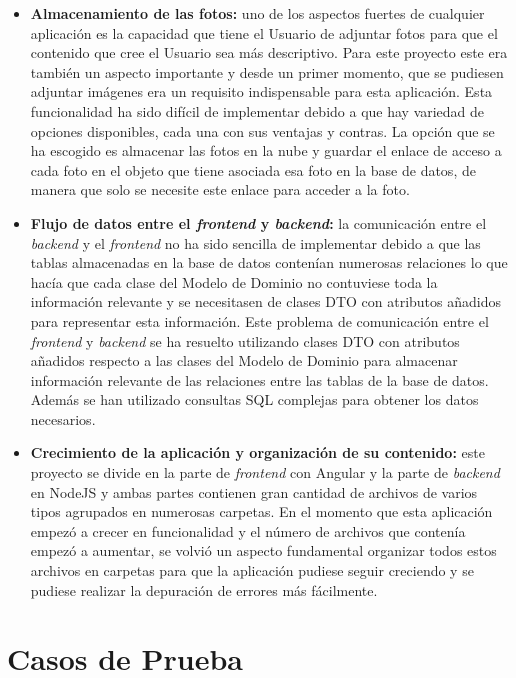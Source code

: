 \begin{itemize}
    \item \textbf{Almacenamiento de las fotos:} uno de los aspectos fuertes de cualquier aplicación es la capacidad que tiene el Usuario de adjuntar fotos para que el contenido que cree el Usuario sea más descriptivo. Para este proyecto este era también un aspecto importante y desde un primer momento, que se pudiesen adjuntar imágenes era un requisito indispensable para esta aplicación. Esta funcionalidad ha sido difícil de implementar debido a que hay variedad de opciones disponibles, cada una con sus ventajas y contras. La opción que se ha escogido es almacenar las fotos en la nube y guardar el enlace de acceso a cada foto en el objeto que tiene asociada esa foto en la base de datos, de manera que solo se necesite este enlace para acceder a la foto. 
    \item \textbf{Flujo de datos entre el \textit{frontend} y \textit{backend}:} la comunicación entre el \textit{backend} y el \textit{frontend} no ha sido sencilla de implementar debido a que las tablas almacenadas en la base de datos contenían numerosas relaciones lo que hacía que cada clase del Modelo de Dominio no contuviese toda la información relevante y se necesitasen de clases DTO con atributos añadidos para representar esta información. Este problema de comunicación entre el \textit{frontend} y \textit{backend} se ha resuelto utilizando clases DTO con atributos añadidos respecto a las clases del Modelo de Dominio para almacenar información relevante de las relaciones entre las tablas de la base de datos. Además se han utilizado consultas SQL complejas para obtener los datos necesarios.
     
    \item \textbf{Crecimiento de la aplicación y organización de su contenido:} este proyecto se divide en la parte de \textit{frontend} con Angular y la parte de \textit{backend} en NodeJS y ambas partes contienen gran cantidad de archivos de varios tipos agrupados en numerosas carpetas. En el momento que esta aplicación empezó a crecer en funcionalidad y el número de archivos que contenía empezó a aumentar, se volvió un aspecto fundamental organizar todos estos archivos en carpetas para que la aplicación pudiese seguir creciendo y se pudiese realizar la depuración de errores más fácilmente. 
\end{itemize}



\section{Casos de Prueba}

